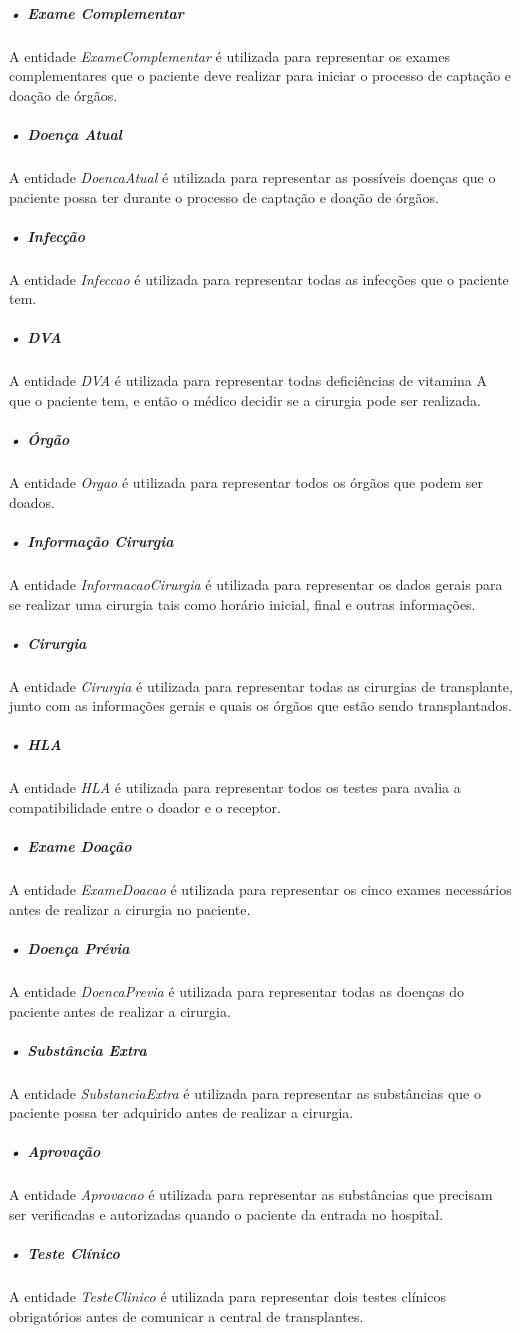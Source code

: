 \documentclass[portuguese,oneside]{tcc}
\begin{document}
\subparagraph{• Exame Complementar}
A entidade \textit{ExameComplementar} é utilizada para representar os exames complementares que o paciente deve realizar para iniciar o processo de captação e doação de órgãos.

\subparagraph{• Doença Atual}
A entidade \textit{DoencaAtual} é utilizada para representar as possíveis doenças que o paciente possa ter durante o processo de captação e doação de órgãos.

\subparagraph{• Infecção}
A entidade \textit{Infeccao} é utilizada para representar todas as infecções que o paciente tem.

\subparagraph{• DVA}
A entidade \textit{DVA} é utilizada para representar todas deficiências de vitamina A que o paciente tem, e então o médico decidir se a cirurgia pode ser realizada.

\subparagraph{• Órgão}
A entidade \textit{Orgao} é utilizada para representar todos os órgãos que podem ser doados.

\subparagraph{• Informação Cirurgia}
A entidade \textit{InformacaoCirurgia} é utilizada para representar os dados gerais para se realizar uma cirurgia tais como horário inicial, final e outras informações.

\subparagraph{• Cirurgia}
A entidade \textit{Cirurgia} é utilizada para representar todas as cirurgias  de transplante, junto com as informações gerais e quais os órgãos que estão sendo transplantados.

\subparagraph{• HLA}
A entidade \textit{HLA} é utilizada para representar todos os testes para avalia a compatibilidade entre o doador e o receptor.

\subparagraph{• Exame Doação}
A entidade \textit{ExameDoacao} é utilizada para representar os cinco exames necessários antes de realizar a cirurgia no paciente.

\subparagraph{• Doença Prévia}
A entidade \textit{DoencaPrevia} é utilizada para representar todas as doenças do paciente antes de realizar a cirurgia.

\subparagraph{• Substância Extra}
A entidade \textit{SubstanciaExtra} é utilizada para representar as substâncias que o paciente possa ter adquirido antes de realizar a cirurgia.

\subparagraph{• Aprovação}
A entidade \textit{Aprovacao} é utilizada para representar as substâncias que precisam ser verificadas e autorizadas quando o paciente da entrada no hospital. 

\subparagraph{• Teste Clínico}
A entidade \textit{TesteClinico} é utilizada para representar dois testes clínicos obrigatórios antes de comunicar a central de transplantes.
\end{document}
